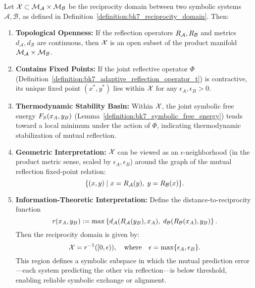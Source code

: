 \begin{proposition}
\label{prop:bk7_structural_properties_of_reciprocity_domain}
Let $\mathcal{X} \subset \mathcal{M}_{\mathcal{A}} \times \mathcal{M}_{\mathcal{B}}$ be the reciprocity domain between two symbolic systems $\mathcal{A}, \mathcal{B}$, as defined in Definition~\ref{definition:bk7_reciprocity_domain}. Then:
\begin{enumerate}
    \item \textbf{Topological Openness:} If the reflection operators \(R_{\mathcal{A}}, R_{\mathcal{B}}\) and metrics \(d_{\mathcal{A}}, d_{\mathcal{B}}\) are continuous, then $\mathcal{X}$ is an open subset of the product manifold \(\mathcal{M}_{\mathcal{A}} \times \mathcal{M}_{\mathcal{B}}\).
    
    \item \textbf{Contains Fixed Points:} If the joint reflective operator $\Phi$ (Definition~\ref{definition:bk7_adaptive_reflection_operator_t}) is contractive, its unique fixed point $(x^*, y^*)$ lies within $\mathcal{X}$ for any $\epsilon_A, \epsilon_B > 0$.
    
    \item \textbf{Thermodynamic Stability Basin:} Within $\mathcal{X}$, the joint symbolic free energy $F_S(x_A, y_B)$ (Lemma~\ref{definition:bk7_symbolic_free_energy}) tends toward a local minimum under the action of $\Phi$, indicating thermodynamic stabilization of mutual reflection.
    
    \item \textbf{Geometric Interpretation:} $\mathcal{X}$ can be viewed as an $\epsilon$-neighborhood (in the product metric sense, scaled by $\epsilon_A, \epsilon_B$) around the graph of the mutual reflection fixed-point relation:
    \[
    \{(x, y) \mid x = R_{\mathcal{A}}(y),\; y = R_{\mathcal{B}}(x)\}.
    \]
    
    \item \textbf{Information-Theoretic Interpretation:} 
    Define the distance-to-reciprocity function
    \[
    r(x_A, y_B) := \max\left\{
      d_{\mathcal{A}}(R_{\mathcal{A}}(y_B), x_A),\;
      d_{\mathcal{B}}(R_{\mathcal{B}}(x_A), y_B)
    \right\}.
    \]
    Then the reciprocity domain is given by:
    \[
    \mathcal{X} = r^{-1}([0, \epsilon)), \quad \text{where} \quad
    \epsilon = \max\{\epsilon_A, \epsilon_B\}.
    \]
    This region defines a symbolic subspace in which the mutual prediction error—each system predicting the other via reflection—is below threshold, enabling reliable symbolic exchange or alignment.
\end{enumerate}
\end{proposition}
